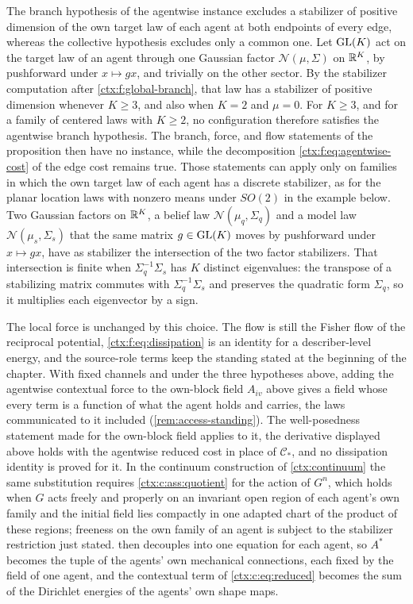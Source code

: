 The branch hypothesis of the agentwise instance excludes a stabilizer of positive dimension of the own target law of each agent at both endpoints of every edge, whereas the collective hypothesis excludes only a common one. Let $\mathrm{GL}(K)$ act on the target law of an agent through one Gaussian factor $\mathcal N(\mu,\Sigma)$ on $\mathbb R^K$, by pushforward under $x\mapsto gx$, and trivially on the other sector. By the stabilizer computation after \cref{ctx:f:global-branch}, that law has a stabilizer of positive dimension whenever $K\geq3$, and also when $K=2$ and $\mu=0$. For $K\geq3$, and for a family of centered laws with $K\geq2$, no configuration therefore satisfies the agentwise branch hypothesis. The branch, force, and flow statements of the proposition then have no instance, while the decomposition \cref{ctx:f:eq:agentwise-cost} of the edge cost remains true. Those statements can apply only on families in which the own target law of each agent has a discrete stabilizer, as for the planar location laws with nonzero means under $SO(2)$ in the example below. Two Gaussian factors on $\mathbb R^K$, a belief law $\mathcal N(\mu_q,\Sigma_q)$ and a model law $\mathcal N(\mu_s,\Sigma_s)$ that the same matrix $g\in\mathrm{GL}(K)$ moves by pushforward under $x\mapsto gx$, have as stabilizer the intersection of the two factor stabilizers. That intersection is finite when $\Sigma_q^{-1}\Sigma_s$ has $K$ distinct eigenvalues: the transpose of a stabilizing matrix commutes with $\Sigma_q^{-1}\Sigma_s$ and preserves the quadratic form $\Sigma_q$, so it multiplies each eigenvector by a sign.

The local force is unchanged by this choice. The flow is still the Fisher flow of the reciprocal potential, \cref{ctx:f:eq:dissipation} is an identity for a describer-level energy, and the source-role terms keep the standing stated at the beginning of the chapter. With fixed channels and under the three hypotheses above, adding the agentwise contextual force to the own-block field $A_{iv}$ above gives a field whose every term is a function of what the agent holds and carries, the laws communicated to it included (\cref{rem:access-standing}). The well-posedness statement made for the own-block field applies to it, the derivative displayed above holds with the agentwise reduced cost in place of $\mathcal C_*$, and no dissipation identity is proved for it. In the continuum construction of \cref{ctx:continuum} the same substitution requires \cref{ctx:c:ass:quotient} for the action of $G^n$, which holds when $G$ acts freely and properly on an invariant open region of each agent's own family and the initial field lies compactly in one adapted chart of the product of these regions; freeness on the own family of an agent is subject to the stabilizer restriction just stated.  then decouples into one equation for each agent, so $A^*$ becomes the tuple of the agents' own mechanical connections, each fixed by the field of one agent, and the contextual term of \cref{ctx:c:eq:reduced} becomes the sum of the Dirichlet energies of the agents' own shape maps.

